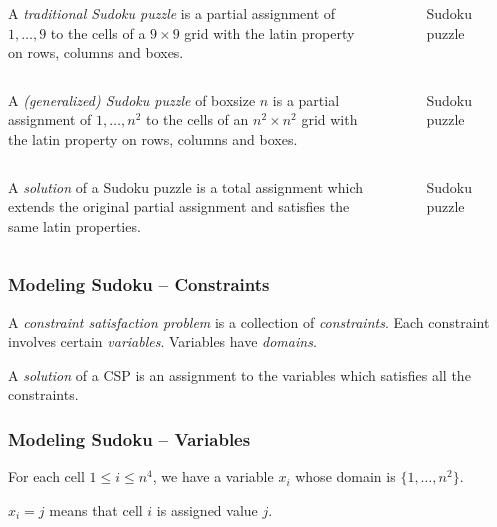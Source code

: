 \documentclass{beamer}
\begin{document}
\begin{frame}
 \begin{columns}[c] 
   A \emph{traditional Sudoku puzzle} is a partial assignment of $1,\dots,9$ to the cells of a $9\times 9$ grid with the latin property on rows, columns and boxes.
   \begin{figure}[h]
    \centering
    \sudokuexampleone
    \caption{Sudoku puzzle}
   \end{figure} 
 \end{columns}
\end{frame}

\begin{frame}
 \begin{columns}[c]
   A \emph{(generalized) Sudoku puzzle} of boxsize $n$ is a partial assignment of $1,\dots,n^2$ to the cells of an $n^2\times n^2$ grid with the latin property on rows, columns and boxes.
   \begin{figure}[h]
    \centering
    \sudokuexampleone
    \caption{Sudoku puzzle}
   \end{figure} 
 \end{columns}
\end{frame}

\begin{frame}
 \begin{columns}[c] 
   A \emph{solution} of a Sudoku puzzle is a total assignment which extends the original partial assignment and satisfies the same latin properties.
   \begin{figure}[h]
    \centering
    \sudokuexampletwo
    \caption{Sudoku puzzle}
   \end{figure} 
 \end{columns}
\end{frame}

\begin{frame}[fragile]
\frametitle{Modeling Sudoku -- Constraints}

A \emph{constraint satisfaction problem} is a collection of \emph{constraints}. Each constraint involves certain \emph{variables}. Variables have \emph{domains}.

\pause

A \emph{solution} of a CSP is an assignment to the variables which satisfies all the constraints.
\end{frame}

\begin{frame}[fragile]
\frametitle{Modeling Sudoku -- Variables}

For each cell $1\leq i \leq n^4$, we have a variable $x_i$ whose domain is $\{1,\ldots,n^2\}$.

\pause

$x_i = j$ means that cell $i$ is assigned value $j$.

\end{frame}
\end{document}

